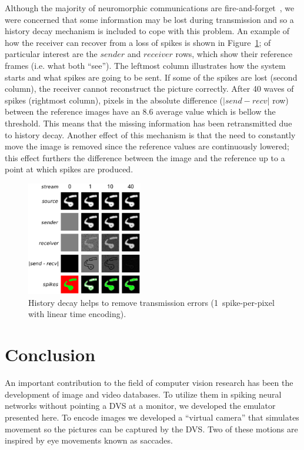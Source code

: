 \documentclass[conference]{IEEEtran}
\begin{document}

Although the majority of neuromorphic communications are fire-and-forget~\cite{Rast2015}, we were concerned that some information may be lost during transmission and so a history decay mechanism is included to cope with this problem. An example of how the receiver can recover from a loss of spikes is shown in Figure~\ref{fig:history_decay}; of particular interest are the $sender$ and $receiver$ rows, which show their reference frames (i.e. what both ``see''). The leftmost column illustrates how the system starts and what spikes are going to be sent. 
If some of the spikes are lost (second column), the receiver cannot reconstruct the picture correctly. After 40 waves of spikes (rightmost column),  pixels in the absolute difference ($|send-recv|$ row) between the reference images have an 8.6 average value which is bellow the threshold. This means that the missing information has been retransmitted due to history decay. Another effect of this mechanism is that the need to constantly move the image is removed since the reference values are continuously lowered; this effect furthers the difference between the image and the reference up to a point at which spikes are produced.

\begin{figure}[htb]
  \centering
  
  \includegraphics[width=0.45\textwidth]{history_decay}
  \caption{History decay helps to remove transmission errors (1~spike-per-pixel with linear time encoding).}
  \label{fig:history_decay}
\end{figure}


\section{Conclusion}
\label{sec:conclusions}
An important contribution to the field of computer vision research has been the development of image and video databases. To utilize them in spiking neural networks without pointing a DVS at a monitor, we developed the emulator presented here. To encode images we developed a ``virtual camera'' that simulates movement so the pictures can be captured by the DVS. Two of these motions are inspired by eye movements known as saccades.
\end{document}
